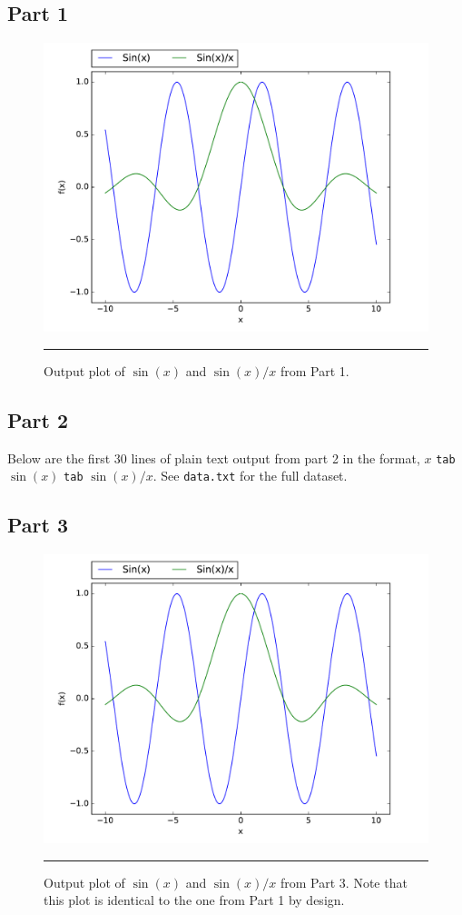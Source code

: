 \documentclass[notitlepage,aps,prd,nofootinbib]{revtex4-1}
\begin{document}
\subsection{Part 1}
\begin{figure}[htbc]
  \centering
  \includegraphics[width=.70\textwidth]{output/part1.pdf}
	{\par\nobreak\rule[9pt]{35em}{0.5pt}\vspace{-5mm}}
	\caption{Output plot of $\sin(x)$ and $\sin(x)/x$ from Part 1.}
	\label{fig:part1}
\end{figure}

\subsection{Part 2}
Below are the first 30 lines of plain text output from part 2 in the format, $x$ \texttt{tab} $\sin(x)$ \texttt{tab} $\sin(x)/x$. See \texttt{data.txt} for the full dataset.



\subsection{Part 3}
\begin{figure}[htbc]
  \centering
  \includegraphics[width=.70\textwidth]{output/part3.pdf}
	{\par\nobreak\rule[9pt]{35em}{0.5pt}\vspace{-5mm}}
	\caption{Output plot of $\sin(x)$ and $\sin(x)/x$ from Part 3. Note that this plot is identical to the one from Part 1 by design.}
	\label{fig:part3}
\end{figure}
\end{document}
